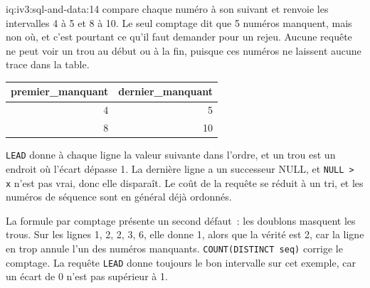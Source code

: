 \begin{solution}{iq:iv3:sql-and-data:14}
 compare chaque numéro à son suivant et renvoie les intervalles 4 à 5 et 8 à 10. Le seul comptage dit que 5 numéros manquent, mais non où, et c'est pourtant ce qu'il faut demander pour un rejeu. Aucune requête ne peut voir un trou au début ou à la fin, puisque ces numéros ne laissent aucune trace dans la table.
\label{lst:iv3:sq:gaps}
\begin{center}\small
\begin{tabular}{rr}
premier\_manquant & dernier\_manquant\\\hline
4 & 5\\
8 & 10
\end{tabular}
\end{center}
\texttt{LEAD} donne à chaque ligne la valeur suivante dans l'ordre, et un trou est un endroit où l'écart dépasse 1. La dernière ligne a un successeur NULL, et \texttt{NULL > x} n'est pas vrai, donc elle disparaît. Le coût de la requête se réduit à un tri, et les numéros de séquence sont en général déjà ordonnés.

La formule par comptage présente un second défaut~: les doublons masquent les trous. Sur les lignes 1, 2, 2, 3, 6, elle donne 1, alors que la vérité est 2, car la ligne en trop annule l'un des numéros manquants. \texttt{COUNT(DISTINCT seq)} corrige le comptage. La requête \texttt{LEAD} donne toujours le bon intervalle sur cet exemple, car un écart de 0 n'est pas supérieur à 1.

\end{solution}

